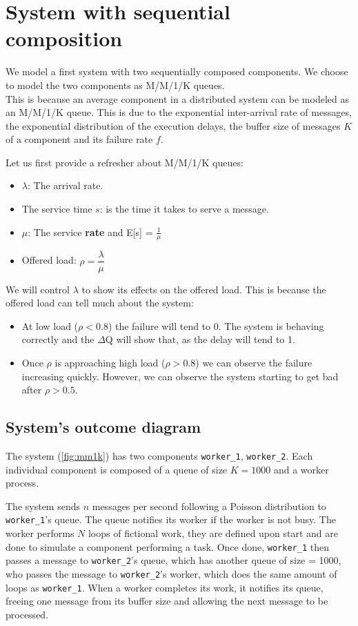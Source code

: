 \section{System with sequential composition}
    We model a first system with two sequentially composed components. We choose to model the two components as M/M/1/K queues. \\
    This is because an average component in a distributed system can be modeled as an M/M/1/K queue. This is due to the exponential inter-arrival rate of messages, the exponential distribution of the execution delays, the buffer size of messages $K$ of a component and its failure rate $f$. \cite{dq-tut}
    
    Let us first provide a refresher about M/M/1/K queues:
    \begin{itemize}
        \item $\lambda$: The arrival rate.
        \item The service time $s$: is the time it takes to serve a message.
        \item $\mu$: The service \textbf{rate} and E[s] = $\frac{1}{\mu}$
        \item Offered load: $\rho = \dfrac{\lambda}{\mu}$
    \end{itemize}

    We will control $\lambda$ to show its effects on the offered load. This is because the offered load can tell much about the system:
    \begin{itemize}
        \item At low load ($\rho < 0.8$) the failure will tend to 0. The system is behaving correctly and the $\Delta$Q will show that, as the delay will tend to 1.
        \item Once $\rho$ is approaching high load ($\rho > 0.8$) we can observe the failure increasing quickly. However, we can observe the system starting to get bad after $\rho > 0.5$. \cite{dq-tut}
    \end{itemize}
    
    \subsection{System's outcome diagram}
    The system (\cref{fig:mm1k}) has two components \texttt{worker\_1}, \texttt{worker\_2}. Each individual component is composed of a queue of size $K = 1000$ and a worker process.
    
    The system sends $n$ messages per second following a Poisson distribution to \texttt{worker\_1}'s queue. 
    The queue notifies its worker if the worker is not busy. The worker performs $N$ loops of fictional work, they are defined upon start and are done to simulate a component performing a task. Once done, \texttt{worker\_1} then passes a message to \texttt{worker\_2}'s queue, which has another queue of size = 1000, who passes the message to \texttt{worker\_2}'s worker, which does the same amount of loops as \texttt{worker\_1}. When a worker completes its work, it notifies its queue, freeing one message from its buffer size and allowing the next message to be processed.
    
